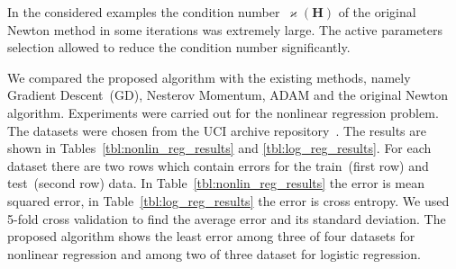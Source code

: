\documentclass[a4paper,12pt]{article}
\renewcommand{\kappa}{\ensuremath{\varkappa}}
\theoremstyle{plain} %
\theoremstyle{definition} %
\theoremstyle{remark} %
\newcommand{\bH}{\mathbf{H}}
\begin{document}
In the considered examples the condition number~$\kappa (\bH)$ of the original Newton method in some iterations was extremely large. 
The active parameters selection allowed to reduce the condition number significantly. 

We compared the proposed algorithm with the existing methods, namely Gradient Descent~(GD), Nesterov Momentum, ADAM and the original Newton algorithm. 
Experiments were carried out for the nonlinear regression problem. 
The datasets were chosen from the UCI archive repository~\cite{uci2017}. 
The results are shown in Tables~\ref{tbl:nonlin_reg_results} and \ref{tbl:log_reg_results}. 
For each dataset there are two rows which contain errors for the train~(first row) and test~(second row) data. 
In Table~\ref{tbl:nonlin_reg_results} the error is mean squared error, in Table~\ref{tbl:log_reg_results} the error is cross entropy.
We used 5-fold cross validation to find the average error and its standard deviation. 
The proposed algorithm shows the least error among three of four datasets for nonlinear regression and among two of three dataset for logistic regression. 
\end{document}
